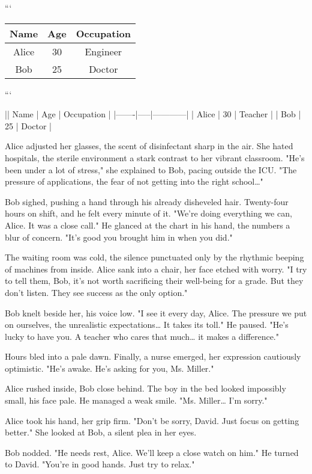 \documentclass{article}
\begin{document}
```
\begin{tabular}{ccc}
    \hline
    Name & Age & Occupation \\
    \hline
    Alice & 30 & Engineer \\
    Bob & 25 & Doctor \\
    \hline
\end{tabular}
```

|| Name  | Age | Occupation |
|-------|-----|------------|
| Alice | 30  | Teacher    |
| Bob   | 25  | Doctor     |

Alice adjusted her glasses, the scent of disinfectant sharp in the air. She hated hospitals, the sterile environment a stark contrast to her vibrant classroom. "He's been under a lot of stress," she explained to Bob, pacing outside the ICU. "The pressure of applications, the fear of not getting into the right school…"

Bob sighed, pushing a hand through his already disheveled hair. Twenty-four hours on shift, and he felt every minute of it. "We're doing everything we can, Alice. It was a close call." He glanced at the chart in his hand, the numbers a blur of concern. "It's good you brought him in when you did."

The waiting room was cold, the silence punctuated only by the rhythmic beeping of machines from inside. Alice sank into a chair, her face etched with worry. "I try to tell them, Bob, it's not worth sacrificing their well-being for a grade. But they don't listen. They see success as the only option."

Bob knelt beside her, his voice low. "I see it every day, Alice. The pressure we put on ourselves, the unrealistic expectations… It takes its toll." He paused. "He's lucky to have you. A teacher who cares that much… it makes a difference."

Hours bled into a pale dawn. Finally, a nurse emerged, her expression cautiously optimistic. "He's awake. He's asking for you, Ms. Miller."

Alice rushed inside, Bob close behind. The boy in the bed looked impossibly small, his face pale. He managed a weak smile. "Ms. Miller… I’m sorry."

Alice took his hand, her grip firm. "Don't be sorry, David. Just focus on getting better." She looked at Bob, a silent plea in her eyes.

Bob nodded. "He needs rest, Alice. We’ll keep a close watch on him." He turned to David. "You're in good hands. Just try to relax."
\end{document}
